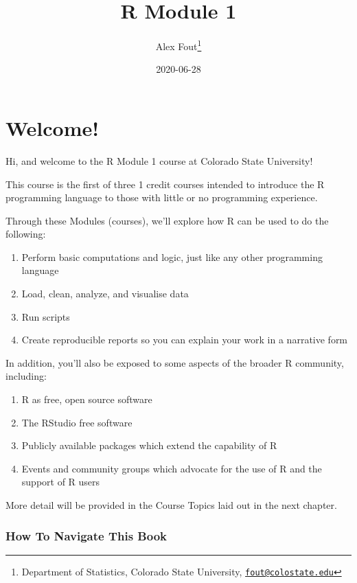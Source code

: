\documentclass[
]{book}
\title{R Module 1}
\author{Alex Fout\footnote{Department of Statistics, Colorado State University, \href{mailto:fout@colostate.edu}{\nolinkurl{fout@colostate.edu}}}}
\date{2020-06-28}
\providecommand{\tightlist}{%
  \setlength{\itemsep}{0pt}\setlength{\parskip}{0pt}}
\begin{document}
\maketitle

{
\setcounter{tocdepth}{1}
\tableofcontents
}
\hypertarget{welcome}{%
\chapter{Welcome!}\label{welcome}}

Hi, and welcome to the R Module 1 course at Colorado State University!

This course is the first of three 1 credit courses intended to introduce the R programming language to those with little or no programming experience.

Through these Modules (courses), we'll explore how R can be used to do the following:

\begin{enumerate}
\def\labelenumi{\arabic{enumi}.}
\tightlist
\item
  Perform basic computations and logic, just like any other programming language
\item
  Load, clean, analyze, and visualise data
\item
  Run scripts
\item
  Create reproducible reports so you can explain your work in a narrative form
\end{enumerate}

In addition, you'll also be exposed to some aspects of the broader R community, including:

\begin{enumerate}
\def\labelenumi{\arabic{enumi}.}
\tightlist
\item
  R as free, open source software
\item
  The RStudio free software
\item
  Publicly available packages which extend the capability of R
\item
  Events and community groups which advocate for the use of R and the support of R users
\end{enumerate}

More detail will be provided in the Course Topics laid out in the next chapter.

\hypertarget{how-to-navigate-this-book}{%
\subsection{How To Navigate This Book}\label{how-to-navigate-this-book}}
\end{document}
